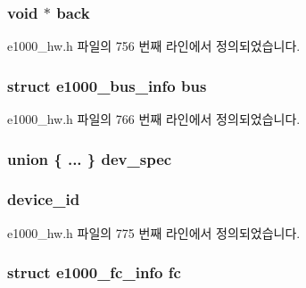 \subsubsection[{\texorpdfstring{back}{back}}]{\setlength{\rightskip}{0pt plus 5cm}void $\ast$ back}\hypertarget{structe1000__hw_a24db0d03dc4f62a477f24d2a675b7d14}{}\label{structe1000__hw_a24db0d03dc4f62a477f24d2a675b7d14}


e1000\+\_\+hw.\+h 파일의 756 번째 라인에서 정의되었습니다.

\subsubsection[{\texorpdfstring{bus}{bus}}]{\setlength{\rightskip}{0pt plus 5cm}struct {\bf e1000\+\_\+bus\+\_\+info} bus}\hypertarget{structe1000__hw_a05847de68c651a09a0dda728db08fc4f}{}\label{structe1000__hw_a05847de68c651a09a0dda728db08fc4f}


e1000\+\_\+hw.\+h 파일의 766 번째 라인에서 정의되었습니다.

\subsubsection[{\texorpdfstring{dev\+\_\+spec}{dev_spec}}]{\setlength{\rightskip}{0pt plus 5cm}union \{ ... \}   dev\+\_\+spec}\hypertarget{structe1000__hw_a498aa966bd77b214f1d67900bf6b8236}{}\label{structe1000__hw_a498aa966bd77b214f1d67900bf6b8236}
\subsubsection[{\texorpdfstring{device\+\_\+id}{device_id}}]{ device\+\_\+id}\hypertarget{structe1000__hw_acba8e06f20df2e05fadf4696cfdbc552}{}\label{structe1000__hw_acba8e06f20df2e05fadf4696cfdbc552}


e1000\+\_\+hw.\+h 파일의 775 번째 라인에서 정의되었습니다.

\subsubsection[{\texorpdfstring{fc}{fc}}]{\setlength{\rightskip}{0pt plus 5cm}struct {\bf e1000\+\_\+fc\+\_\+info} fc}\hypertarget{structe1000__hw_a7b5f8715a9588ca1c4f6fd5b087aede7}{}\label{structe1000__hw_a7b5f8715a9588ca1c4f6fd5b087aede7}


